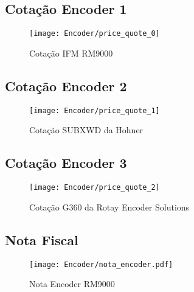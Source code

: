\subsection{Cotação Encoder 1 }
\begin{figure}[H]
 \centering
 \texttt{[image: Encoder/price\_quote\_0]}
 \caption{Cotação IFM RM9000}
\end{figure}

\subsection{Cotação Encoder 2 }
\begin{figure}[H]
 \centering
 \texttt{[image: Encoder/price\_quote\_1]}
 \caption{Cotação SUBXWD da Hohner}
\end{figure}

\subsection{Cotação Encoder 3 }
\begin{figure}[H]
 \centering
 \texttt{[image: Encoder/price\_quote\_2]}
 \caption{Cotação G360 da Rotay Encoder Solutions } 
\end{figure}

\subsection{Nota Fiscal}
\begin{figure}[H]
 \centering
 \texttt{[image: Encoder/nota\_encoder.pdf]}
 \caption{Nota Encoder RM9000}
 \end{figure} 